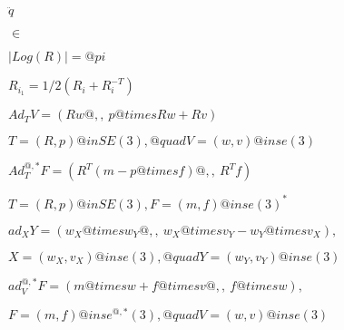 \documentclass{article}
\begin{document}
$ \ddot{q} $
\pagebreak

$ \in $
\pagebreak

$|Log(R)| = @pi$
\pagebreak

$R_{i_1}=1/2(R_i + R_i^{-T})$
\pagebreak

$Ad_TV = ( Rw@,, ~p @times Rw + Rv)$
\pagebreak

$T=(R,p)@in SE(3), @quad V=(w,v)@in se(3) $
\pagebreak

$Ad^{@,*}_TF = ( R^T (m - p@times f)@,,~ R^T f)$
\pagebreak

$T=(R,p)@in SE(3), F=(m,f)@in se(3)^*$
\pagebreak

$ad_X Y = ( w_X @times w_Y@,,~w_X @times v_Y - w_Y @times v_X),$
\pagebreak

$X=(w_X,v_X)@in se(3), @quad Y=(w_Y,v_Y)@in se(3) $
\pagebreak

$ad^{@,*}_V F = (m @times w + f @times v@,,~ f @times w),$
\pagebreak

$F=(m,f)@in se^{@,*}(3), @quad V=(w,v)@in se(3) $
\pagebreak
\end{document}

